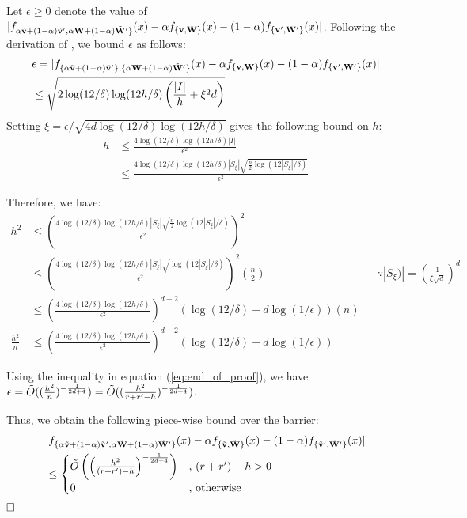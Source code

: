 Let $\epsilon\geq 0$ denote the value of $|f_{\alpha\Tilde{{\mathbf{v}}} + (1-\alpha)\Tilde{{\mathbf{v}}}', \alpha{\mathbf{W}}+(1-\alpha)\Tilde{{\mathbf{W}}}'\}}(x) - \alpha f_{\{{\mathbf{v}},{\mathbf{W}}\}}(x) - (1-\alpha)f_{\{{\mathbf{v'}},{\mathbf{W'}}\}}(x)|$.
Following the derivation of \cite{entezari2021role}, we bound $\epsilon$ as follows:
\begin{align}
    &\epsilon = |f_{\{\alpha\Tilde{{\mathbf{v}}} + (1-\alpha)\Tilde{{\mathbf{v}}}'\}, \{\alpha{\mathbf{W}}+(1-\alpha)\Tilde{{\mathbf{W}}}'\}}(x) - \alpha f_{\{{\mathbf{v}},{\mathbf{W}}\}}(x) - (1-\alpha)f_{\{{\mathbf{v'}},{\mathbf{W'}}\}}(x)|\notag \\
    &\leq \sqrt{2\log(12/\delta)\log(12h/\delta)\left(\frac{|I|}{h} + \xi^2 d\right)}
\end{align}
Setting $\xi=\epsilon/\sqrt{4d\log(12/\delta)\log(12h/\delta)}$ gives the following bound on $h$:
\begin{align*}
    h&\leq \frac{4\log(12/\delta)\log(12h/\delta)|I|}{\epsilon^2} \\
    &\leq \frac{4\log(12/\delta)\log(12h/\delta)|S_\xi|\sqrt{ \frac{n}{2} \log(12|S_\xi|/\delta)}}{\epsilon^2}
\end{align*}

Therefore, we have:
\begin{align}
    h^2&\leq \left(\frac{4\log(12/\delta)\log(12h/\delta)|S_\xi|\sqrt{ \frac{n}{2} \log(12|S_\xi|/\delta)}}{\epsilon^2}\right)^2 \\
    &\leq \left(\frac{4\log(12/\delta)\log(12h/\delta)|S_\xi|\sqrt{\log(12|S_\xi|/\delta)}}{\epsilon^2}\right)^2 \left(\frac{n}{2}\right) && \because |S_\xi)| = \left(\frac{1}{\xi\sqrt{d}}\right)^d \\
    &\leq \left(\frac{4\log(12/\delta)\log(12h/\delta)}{\epsilon^2}\right)^{d+2}(\log(12/\delta) + d\log(1/\epsilon))(n) \\
    \frac{h^2}{n} &\leq \left(\frac{4\log(12/\delta)\log(12h/\delta)}{\epsilon^2}\right)^{d+2}(\log(12/\delta) + d\log(1/\epsilon))\label{eq:end_of_proof}
\end{align}

Using the inequality in equation (\ref{eq:end_of_proof}), we have $\epsilon = \Tilde{O}((\frac{h^2}{n})^{-\frac{1}{2d+4}})=\Tilde{O}((\frac{h^2}{r+r'-h})^{-\frac{1}{2d+4}})$. 

Thus, we obtain the following piece-wise bound over the barrier: 
\begin{align*}
    &|f_{\{\alpha\Tilde{{\mathbf{v}}} + (1-\alpha)\Tilde{{\mathbf{v}}}', \alpha\Tilde{{\mathbf{W}}}+(1-\alpha)\Tilde{{\mathbf{W}}}'\}}(x) - \alpha f_{\{\Tilde{{\mathbf{v}}},\Tilde{{\mathbf{W}}}\}}(x) - (1-\alpha)f_{\{\Tilde{{\mathbf{v}}}',\Tilde{{\mathbf{W}}}'\}}(x)| \nonumber \\
    &\leq\begin{cases}
            \Tilde{O}\left(\left(\frac{h^2}{(r+r')-h}\right)^{-\frac{1}{2d+4}}\right) & \text{, }(r+r')-h > 0 \\
            0 &\text{, otherwise}
        \end{cases}
\end{align*} $\hfill\square$

